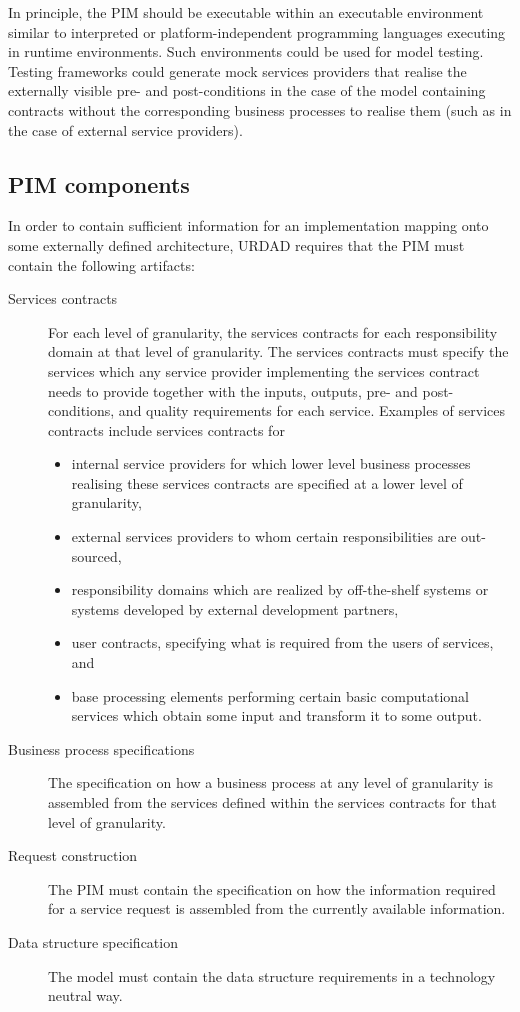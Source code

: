 \documentclass[reviewcopy]{elsart}
\begin{document}
In principle, the PIM should be executable within an executable environment
similar to interpreted or platform-independent programming languages executing
in runtime environments. Such environments could be used for model testing. 
Testing frameworks could generate mock services providers that realise the externally
visible pre- and post-conditions in the case of the model containing contracts without
the corresponding business processes to realise them (such as in the case of external
service providers).


\subsection{PIM components}

In order to contain sufficient information for an implementation mapping onto
some externally defined architecture, 
URDAD requires that the PIM must contain the following artifacts:
\begin{description}
  \item[Services contracts] For each level of granularity, the services
 	contracts for each responsibility domain at that level of
	granularity. The services contracts must specify the services which
	any service provider implementing the services contract needs to
	provide together with the inputs, outputs, pre- and post-conditions, and
	quality requirements for each service.
	Examples of services contracts include services contracts for 
	\begin{itemize}
	  \item internal service providers for which lower level
		business processes
		realising these services contracts are specified at a lower
		level of granularity,
	  \item external services providers to whom
		certain responsibilities are out-sourced,
	  \item responsibility domains which are
		realized by off-the-shelf systems or systems developed by
		external development partners,
	  \item user contracts, specifying what is required from the users of
		services, and
	  \item base processing elements performing certain basic computational
		services which obtain some input and transform it to some
		output.
	\end{itemize}

  \item[Business process specifications] The specification on how a business
	process at any level of granularity is assembled from the services
	defined within the services contracts for that level of granularity.	

  \item[Request construction] The PIM must contain the specification on
	how the information required for a service request is assembled
	from the currently available information.

  \item[Data structure specification] The model must contain the data structure
	requirements in a technology neutral way.
\end{description}
\end{document}
